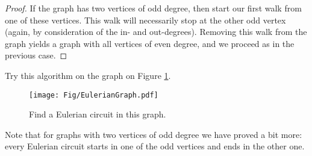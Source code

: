 \begin{proof}
If the graph has two vertices of odd degree, then start our first walk from one of these vertices.
This walk will necessarily stop at the other odd vertex (again, by consideration of the in- and out-degrees).
Removing this walk from the graph yields a graph with all vertices of even degree, and we proceed as in the previous case.
\end{proof}

Try this algorithm on the graph on Figure \ref{fig:EulerianGraph}.

\begin{figure}[h]
\begin{center}
\texttt{[image: Fig/EulerianGraph.pdf]}
\end{center}
\caption{Find a Eulerian circuit in this graph.}
\label{fig:EulerianGraph}
\end{figure}

Note that for graphs with two vertices of odd degree we have proved a bit more:
every Eulerian circuit starts in one of the odd vertices and ends in the other one.













